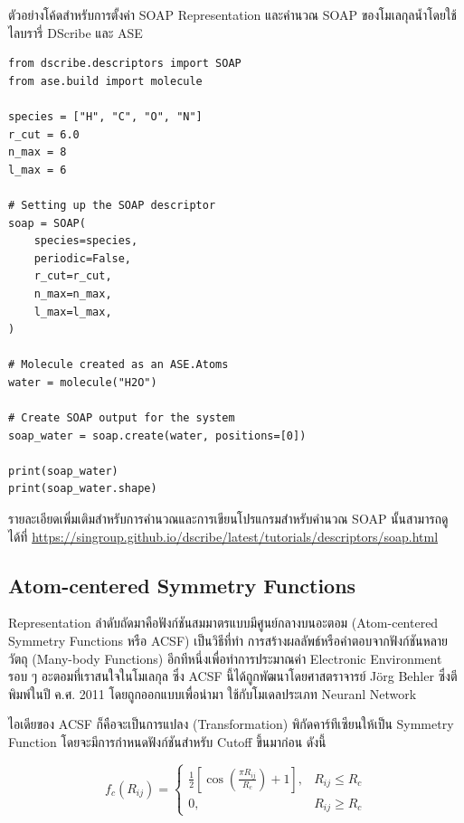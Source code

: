 ตัวอย่างโค้ดสำหรับการตั้งค่า SOAP Representation และคำนวณ SOAP ของโมเลกุลน้ำโดยใช้ไลบรารี่ DScribe และ ASE

\begin{lstlisting}[style=MyPython]
from dscribe.descriptors import SOAP
from ase.build import molecule

species = ["H", "C", "O", "N"]
r_cut = 6.0
n_max = 8
l_max = 6

# Setting up the SOAP descriptor
soap = SOAP(
    species=species,
    periodic=False,
    r_cut=r_cut,
    n_max=n_max,
    l_max=l_max,
)

# Molecule created as an ASE.Atoms
water = molecule("H2O")

# Create SOAP output for the system
soap_water = soap.create(water, positions=[0])

print(soap_water)
print(soap_water.shape)
\end{lstlisting}

รายละเอียดเพิ่มเติมสำหรับการคำนวณและการเขียนโปรแกรมสำหรับคำนวณ SOAP นั้นสามารถดูได้ที่
\url{https://singroup.github.io/dscribe/latest/tutorials/descriptors/soap.html}

\subsection{Atom-centered Symmetry Functions}
\label{ssec:acsf}

Representation ลำดับถัดมาคือฟังก์ชันสมมาตรแบบมีศูนย์กลางบนอะตอม (Atom-centered Symmetry Functions หรือ ACSF) เป็นวิธีที่ทำ%
การสร้างผลลัพธ์หรือคำตอบจากฟังก์ชันหลายวัตถุ (Many-body Functions) อีกทีหนึ่งเพื่อทำการประมาณค่า Electronic Environment รอบ ๆ 
อะตอมที่เราสนใจในโมเลกุล ซึ่ง ACSF นี้ได้ถูกพัฒนาโดยศาสตราจารย์ J\"{o}rg Behler ซึ่งตีพิมพ์ในปี ค.ศ. 2011 โดยถูกออกแบบเพื่อนำมา%
ใช้กับโมเดลประเภท Neuranl Network \autocite{behler2011a}

ไอเดียของ ACSF ก็คือจะเป็นการแปลง (Transformation) พิกัดคาร์ทีเซียนให้เป็น Symmetry Function โดยจะมีการกำหนดฟังก์ชันสำหรับ 
Cutoff ขึ้นมาก่อน ดังนี้

\begin{equation}\label{eq:acsf_cutoff}
    f_{c}(R_{ij}) = 
    \begin{cases}
        \frac{1}{2}[\cos(\frac{\pi R_{ij}}{R_{c}}) + 1], & R_{ij} \le R_{c} \\
        0,                                             & R_{ij} \ge R_{c}
    \end{cases}
\end{equation}

